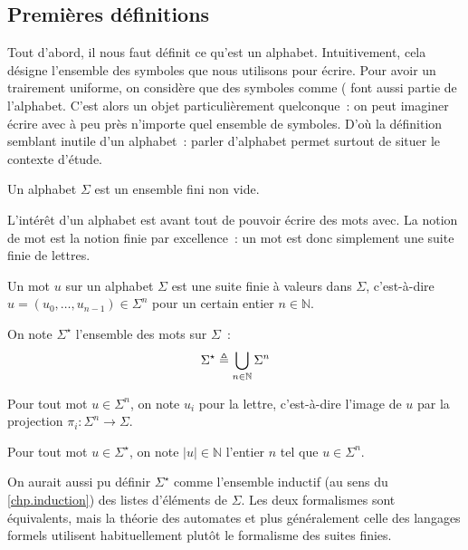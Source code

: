 \subsection{Premières définitions}

Tout d'abord, il nous faut définit ce qu'est un alphabet. Intuitivement, cela
désigne l'ensemble des symboles que nous utilisons pour écrire. Pour avoir un
trairement uniforme, on considère que des symboles comme \og ( \fg font aussi
partie de l'alphabet. C'est alors un objet particulièrement quelconque~: on peut
imaginer écrire avec à peu près n'importe quel ensemble de symboles. D'où la
définition semblant inutile d'un alphabet~: parler d'alphabet permet surtout de
situer le contexte d'étude.

\begin{definition}[Alphabet]
  Un alphabet $\Sigma$ est un ensemble fini non vide.
\end{definition}

L'intérêt d'un alphabet est avant tout de pouvoir écrire des mots avec. La
notion de mot est la notion finie par excellence~: un mot est donc simplement
une suite finie de lettres.

\begin{definition}[Mot]
  Un mot $u$ sur un alphabet $\Sigma$ est une suite finie à valeurs dans
  $\Sigma$, c'est-à-dire
  $u = (u_0,\ldots,u_{n-1})\in \Sigma^n$ pour un certain entier $n\in\mathbb N$.

  On note $\Sigma^\star$ l'ensemble des mots sur $\Sigma$~:
  \[\Sigma^\star \triangleq \bigcup_{n\in \mathbb N} \Sigma^n\]
\end{definition}

\begin{notation}
  Pour tout mot $u\in\Sigma^n$, on note $u_i$ pour la
   lettre, c'est-à-dire l'image de $u$ par la
  projection $\pi_i : \Sigma^n \to \Sigma$.

  Pour tout mot $u\in\Sigma^\star$, on note $|u|\in\mathbb N$ l'entier $n$ tel
  que $u\in \Sigma^n$.
\end{notation}

\begin{remark}
  On aurait aussi pu définir $\Sigma^\star$ comme l'ensemble inductif (au sens
  du \cref{chp.induction}) des listes d'éléments de $\Sigma$. Les deux
  formalismes sont équivalents, mais la théorie des automates et plus
  généralement celle des langages formels utilisent habituellement plutôt le
  formalisme des suites finies.
\end{remark}


